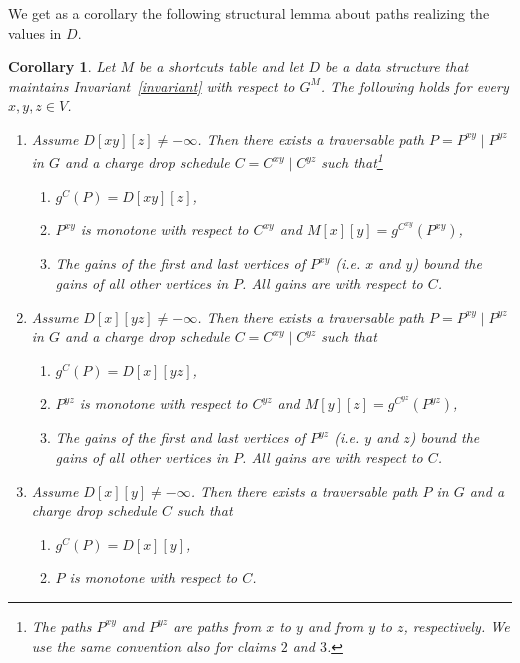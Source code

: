\documentclass[11pt]{article}
\newtheorem{corollary}[theorem]{Corollary}
\begin{document}
We get as a corollary the following structural lemma about paths realizing the values in $D$.


\begin{corollary}\label{cor:M-G-connection}
    Let $M$ be a shortcuts table and let $D$ be a data structure that maintains Invariant~\ref{invariant} with respect to $G^M$. The following holds for every $x,y,z\in V$. 
    \begin{enumerate}
        \item \label{cor:1}
        Assume $D[xy][z]\neq -\infty$. Then there exists a traversable path $P = P^{xy}\mid P^{yz}$ in $G$ and a charge drop schedule $C = C^{xy}\mid C^{yz}$ such that\footnote{The paths $P^{xy}$ and $P^{yz}$ are paths from $x$ to $y$ and from $y$ to $z$, respectively. We use the same convention also for claims $2$ and $3$.}
        \begin{enumerate}[label=(\alph*)]
            \item \label{cor:1a}  $g^C(P) = D[xy][z]$,
            \item \label{cor:1b} $P^{xy}$ is monotone with respect to $C^{xy}$ and $M[x][y] = g^{C^{xy}}(P^{xy})$,
            \item \label{cor:1c} The gains of the first and last vertices of $P^{xy}$ (i.e. $x$ and $y$) bound the gains of all other vertices in $P$. All gains are with respect to $C$.
        \end{enumerate}
        \item \label{cor:2}
        Assume $D[x][yz]\neq -\infty$. Then there exists a traversable path $P = P^{xy}\mid P^{yz}$ in $G$ and a charge drop schedule $C = C^{xy}\mid C^{yz}$ such that
        \begin{enumerate}[label=(\alph*)]
            \item \label{cor:2a} $g^C(P) = D[x][yz]$,
            \item \label{cor:2b} $P^{yz}$ is monotone with respect to $C^{yz}$ and $M[y][z] = g^{C^{yz}}(P^{yz})$,
            \item \label{cor:2c} The gains of the first and last vertices of $P^{yz}$ (i.e. $y$ and $z$) bound the gains of all other vertices in $P$. All gains are with respect to $C$.
        \end{enumerate}
        \item \label{cor:3}
         Assume $D[x][y]\neq -\infty$. Then there exists a traversable path $P $ in $G$ and a charge drop schedule $C$ such that
        \begin{enumerate}[label=(\alph*)]
            \item \label{cor:3a} $g^C(P) = D[x][y]$,
            \item \label{cor:3b} $P$ is monotone with respect to $C$.
        \end{enumerate}
    \end{enumerate}
\end{corollary}
\end{document}
